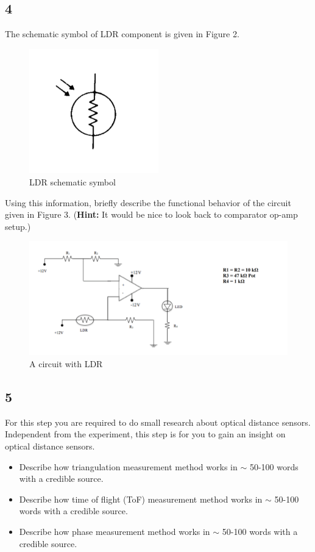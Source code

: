 \documentclass[letterpaper,12pt]{article}
\begin{document}
\subsection*{4}
The schematic symbol of LDR component is given in Figure 2.
\begin{figure}[H]
	\centering
	\includegraphics[width=0.5\textwidth]{LDR_symbol.png}
	\caption{LDR schematic symbol}
\end{figure} 
Using this information, briefly describe the functional behavior of the circuit given in Figure 3. (\textbf{Hint:} It would be nice to look back to comparator op-amp setup.)
\begin{figure}[H]
	\centering
	\includegraphics[width=1\textwidth]{darkness.png}
	\caption{A circuit with LDR}
\end{figure} 

\subsection*{5}
For this step you are required to do small research about optical distance sensors. Independent from the experiment, this step is for you to gain an insight on optical distance sensors.
\begin{itemize}
	\item Describe how triangulation measurement method works in \(\sim\) 50-100 words with a credible source. 
	\item Describe how time of flight (ToF) measurement method works in \(\sim\) 50-100 words with a credible source. 
	\item Describe how phase measurement method works in \(\sim\) 50-100 words with a credible source. 
\end{itemize}
\end{document}
